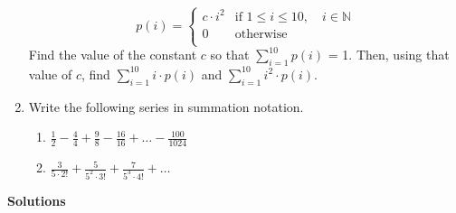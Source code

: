 \documentclass{article}
\begin{document}
\begin{enumerate}
                        $$ p(i) = \begin{cases} 
                        c\cdot i^2 & \text{if $1 
                        \leq i \leq 10, \quad i \in \mathbb{N}$} \\
                        0 & \text{otherwise} \\
                        \end{cases}
                        $$
                        Find the value of the constant $c$ so that $\displaystyle \sum_{i=1}^{10} p(i)$ = 1. Then, using that value of $c$, find $\displaystyle \sum_{i=1}^{10} i\cdot p(i)$ and $\displaystyle \sum_{i=1}^{10} i^2 \cdot p(i)$.
    \item Write the following series in summation notation.
                           \begin{enumerate}
                            \item $\displaystyle \frac{1}{2}-\frac{4}{4}+\frac{9}{8}-\frac{16}{16} + \ldots - \frac{100}{1024}$
                            \item $\displaystyle \frac{3}{5\cdot 2!}+\frac{5}{5^2\cdot 3!}+\frac{7}{5^3\cdot 4!} + \ldots$
            \end{enumerate}
    \end{enumerate}
    \newpage
    \begin{center}
        \textbf{\Large{Solutions}}
    \end{center}
\end{document}
